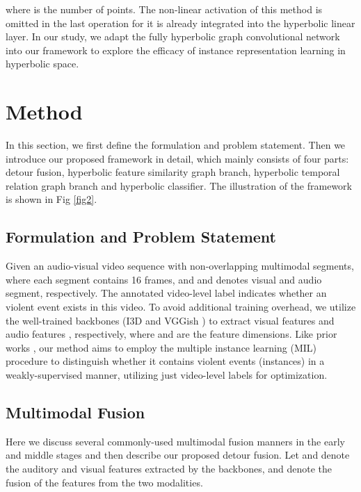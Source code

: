\documentclass[sigconf]{acmart}
\begin{document}
where  is the number of points. The non-linear activation of this method is omitted in the last operation for it is already integrated into the hyperbolic linear layer. In our study, we adapt the fully hyperbolic graph convolutional network into our framework to explore the efficacy of instance representation learning in hyperbolic space.








\section{Method}
In this section, we first define the formulation and problem statement. Then we introduce our proposed framework in detail, which mainly consists of four parts: detour fusion, hyperbolic feature similarity graph branch, hyperbolic temporal relation graph branch and hyperbolic classifier. The illustration of the framework is shown in Fig \ref{fig2}.
 
 \subsection{Formulation and Problem Statement}
Given an audio-visual video sequence  with  non-overlapping multimodal segments, where each segment contains 16 frames, and  and  denotes visual and audio segment, respectively. The annotated video-level label  indicates whether an violent event exists in this video. To avoid additional training overhead, we utilize the well-trained backbones (I3D\cite{c:12} and VGGish \cite{Gemmeke_Ellis, Hershey_Chaudhuri}) to extract visual features  and audio features , respectively, where  and  are the feature dimensions. Like prior works \cite{c:2, c:4, c:7, c:9}, our method aims to employ the multiple instance learning (MIL) procedure to distinguish whether it contains violent events (instances) in a weakly-supervised manner, utilizing just video-level labels  for optimization.

\subsection{Multimodal Fusion}
Here we discuss several commonly-used multimodal fusion manners in the early and middle stages and then describe our proposed detour fusion. Let  and  denote the auditory and visual features extracted by the backbones, and  denote the fusion of the features from the two modalities.
\end{document}
